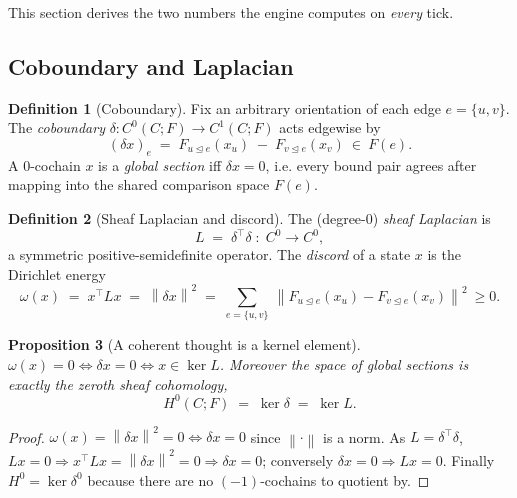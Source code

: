 \documentclass[11pt]{article}
\theoremstyle{definition}
\newtheorem{definition}{Definition}[section]
\theoremstyle{plain}
\newtheorem{proposition}[definition]{Proposition}
\theoremstyle{remark}
\newcommand{\CC}{C}                 %
\newcommand{\Fs}{F}                 %
\newcommand{\rest}[1]{F_{#1}}
\newcommand{\norm}[1]{\left\lVert #1 \right\rVert}
\newcommand{\triang}{\trianglelefteq}
\newcommand{\Hzero}{H^{0}}
\begin{document}
This section derives the two numbers the engine computes on \emph{every} tick.

\subsection{Coboundary and Laplacian}

\begin{definition}[Coboundary]\label{def:coboundary}
Fix an arbitrary orientation of each edge $e=\{u,v\}$. The \emph{coboundary}
$\delta:C^0(\CC;\Fs)\to C^1(\CC;\Fs)$ acts edgewise by
\begin{equation}\label{eq:coboundary}
(\delta x)_e \;=\; \rest{u\triang e}(x_u)\;-\;\rest{v\triang e}(x_v)\ \in\ \Fs(e).
\end{equation}
A $0$-cochain $x$ is a \emph{global section} iff $\delta x=0$, i.e. every bound pair
agrees after mapping into the shared comparison space $\Fs(e)$.
\end{definition}

\begin{definition}[Sheaf Laplacian and discord]\label{def:laplacian}
The (degree-$0$) \emph{sheaf Laplacian} is
\begin{equation}\label{eq:laplacian}
L \;=\; \delta^{\top}\delta \;:\; C^0\to C^0 ,
\end{equation}
a symmetric positive-semidefinite operator. The \emph{discord} of a state $x$ is the
Dirichlet energy
\begin{equation}\label{eq:omega}
\omega(x)\;=\;x^{\top}Lx\;=\;\norm{\delta x}^2
\;=\;\sum_{e=\{u,v\}}\ \norm{\rest{u\triang e}(x_u)-\rest{v\triang e}(x_v)}^{2}\ \ge 0 .
\end{equation}
\end{definition}

\begin{proposition}[A coherent thought is a kernel element]\label{prop:H0}
$\omega(x)=0 \iff \delta x = 0 \iff x\in\ker L$. Moreover the space of global
sections is exactly the zeroth sheaf cohomology,
\begin{equation}
\Hzero(\CC;\Fs)\;=\;\ker\delta\;=\;\ker L .
\end{equation}
\end{proposition}
\begin{proof}
$\omega(x)=\norm{\delta x}^2=0\iff \delta x=0$ since $\norm{\cdot}$ is a norm. As
$L=\delta^\top\delta$, $Lx=0\Rightarrow x^\top Lx=\norm{\delta x}^2=0\Rightarrow\delta
x=0$; conversely $\delta x=0\Rightarrow Lx=0$. Finally $\Hzero=\ker\delta^{0}$ because
there are no $(-1)$-cochains to quotient by.
\end{proof}
\end{document}
